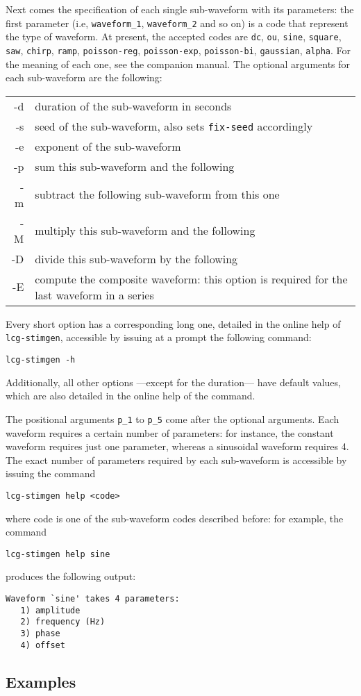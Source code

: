 Next comes the specification of each single sub-waveform with its
parameters: the first parameter (i.e, \verb+waveform_1+,
\verb+waveform_2+ and so on) is a code that represent the type of
waveform. At present, the accepted codes are \verb+dc+, \verb+ou+,
\verb+sine+, \verb+square+, \verb+saw+, \verb+chirp+, \verb+ramp+,
\verb+poisson-reg+, \verb+poisson-exp+, \verb+poisson-bi+,
\verb+gaussian+, \verb+alpha+. For the meaning of each one, see the
companion manual. The optional arguments for each sub-waveform are the
following:
\begin{table}[h!!]
\begin{tabular}{r|l}
-d & duration of the sub-waveform in seconds \\
-s & seed of the sub-waveform, also sets \verb+fix-seed+ accordingly \\
-e & exponent of the sub-waveform \\
-p & sum this sub-waveform and the following \\
-m & subtract the following sub-waveform from this one \\
-M & multiply this sub-waveform and the following \\
-D & divide this sub-waveform by the following \\
-E & compute the composite waveform: this option is required for the last waveform in a series
\end{tabular}
\label{tab:optargs}
\end{table}
\newline
Every short option has a corresponding long one, detailed in the
online help of \verb+lcg-stimgen+, accessible by issuing at a prompt the
following command:
\begin{lstlisting}
lcg-stimgen -h
\end{lstlisting}
Additionally, all other options ---except for the duration--- have default
values, which are also detailed in the online help of the command.

The positional arguments \verb+p_1+ to \verb+p_5+ come after the
optional arguments. Each waveform requires a certain number of
parameters: for instance, the constant waveform requires just one
parameter, whereas a sinusoidal waveform requires 4. The exact number
of parameters required by each sub-waveform is accessible by issuing
the command
\begin{lstlisting}
lcg-stimgen help <code>
\end{lstlisting}
where code is one of the sub-waveform codes described before: for
example, the command
\begin{lstlisting}
lcg-stimgen help sine
\end{lstlisting}
produces the following output:
\begin{verbatim}
Waveform `sine' takes 4 parameters:
   1) amplitude
   2) frequency (Hz)
   3) phase
   4) offset
\end{verbatim}
\subsection{Examples}